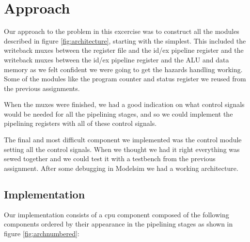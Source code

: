 \documentclass[11pt]{report}
\begin{document}
\section*{Approach}


Our approach to the problem in this excercise was to construct all the 
modules described in figure \ref{fig:architecture}, starting with the simplest.  %
This included the writeback muxes between the register file and the id/ex
pipeline register and the writeback muxes between the id/ex pipeline 
register and the ALU and data memory as we felt confident we were going 
to get the hazards handling working. 
Some of the modules like the program counter and status register 
we reused from the previous assignments.

When the muxes were finished, we had a good indication on what control
signals would be needed for all the pipelining stages, and so we could 
implement the pipelining registers with all of these control signals.

The final and most difficult component we implemented was the control
module setting all the control signals. When we thought we had it right
everything was sewed together and we could test it with a testbench
from the previous assignment. After some debugging in Modelsim we had 
a working architecture.

\subsection*{Implementation}



Our implementation consists of a cpu component composed of
the following components ordered by their appearance 
in the pipelining stages as shown in figure \ref{fig:archnumbered}:
	
\end{document}
